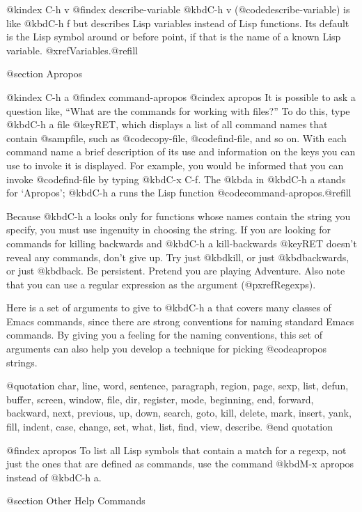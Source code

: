 {{@kindex C-h v
@findex describe-variable
  @kbd{C-h v} (@code{describe-variable}) is like @kbd{C-h f} but
describes Lisp variables instead of Lisp functions.  Its default is the
Lisp symbol around or before point, if that is the name of a known Lisp
variable.  @xref{Variables}.@refill

@section Apropos

@kindex C-h a
@findex command-apropos
@cindex apropos
  It is possible to ask a question like, ``What are the commands for
working with files?''  To do this, type @kbd{C-h a file @key{RET}},
which displays a list of all command names that contain @samp{file},
such as @code{copy-file}, @code{find-file}, and so on.  With each
command name a brief description of its use and information on the keys
you can use to invoke it is displayed.  For example, you would be
informed that you can invoke @code{find-file} by typing @kbd{C-x C-f}.
The @kbd{a} in @kbd{C-h a} stands for `Apropos'; @kbd{C-h a} runs the
Lisp function @code{command-apropos}.@refill

  Because @kbd{C-h a} looks only for functions whose names contain the
string you specify, you must use ingenuity in choosing the string.  If
you are looking for commands for killing backwards and @kbd{C-h a
kill-backwards @key{RET}} doesn't reveal any commands, don't give up.
Try just @kbd{kill}, or just @kbd{backwards}, or just @kbd{back}.  Be
persistent.  Pretend you are playing Adventure.  Also note that you can
use a regular expression as the argument (@pxref{Regexps}).

  Here is a set of arguments to give to @kbd{C-h a} that covers many
classes of Emacs commands, since there are strong conventions for naming
standard Emacs commands.  By giving you a feeling for the naming
conventions, this set of arguments can also help you develop a
technique for picking @code{apropos} strings.

@quotation
char, line, word, sentence, paragraph, region, page, sexp, list, defun,
buffer, screen, window, file, dir, register, mode,
beginning, end, forward, backward, next, previous, up, down, search, goto,
kill, delete, mark, insert, yank, fill, indent, case,
change, set, what, list, find, view, describe.
@end quotation

@findex apropos
  To list all Lisp symbols that contain a match for a regexp, not just
the ones that are defined as commands, use the command @kbd{M-x apropos}
instead of @kbd{C-h a}.

@section Other Help Commands

}}
